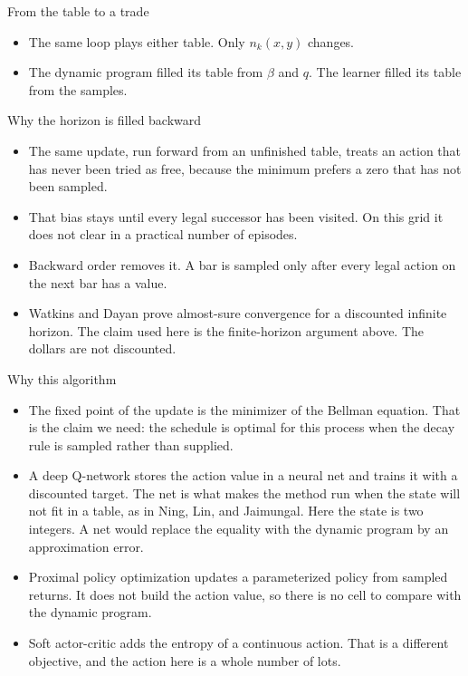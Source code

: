 \documentclass[aspectratio=169,10pt]{beamer}
\newcommand{\currentsource}{}
\newcommand{\framesource}[1]{\gdef\currentsource{#1}}
\newcommand{\aiassisted}{AI assisted, via Grok 4.7}
\begin{document}
\begin{frame}{From the table to a trade}
\framesource{\aiassisted}
\usebox{\tradealg}

\vspace{0.7em}
\begin{itemize}
\item The same loop plays either table. Only \(n_k(x,y)\) changes.
\item The dynamic program filled its table from \(\beta\) and \(q\). The learner filled its table from the samples.
\end{itemize}
\end{frame}

\begin{frame}{Why the horizon is filled backward}
\framesource{Watkins and Dayan, 1992. Finite-horizon argument: \aiassisted.}
\begin{itemize}
\item The same update, run forward from an unfinished table, treats an action that has never been tried as free, because the minimum prefers a zero that has not been sampled.
\item That bias stays until every legal successor has been visited. On this grid it does not clear in a practical number of episodes.
\item Backward order removes it. A bar is sampled only after every legal action on the next bar has a value.
\item Watkins and Dayan prove almost-sure convergence for a discounted infinite horizon. The claim used here is the finite-horizon argument above. The dollars are not discounted.
\end{itemize}
\end{frame}

\begin{frame}{Why this algorithm}
\framesource{Mnih et al., 2015; Schulman et al., 2017; Haarnoja et al., 2018}
\begin{itemize}
\item The fixed point of the update is the minimizer of the Bellman equation. That is the claim we need: the schedule is optimal for this process when the decay rule is sampled rather than supplied.
\item A deep Q-network stores the action value in a neural net and trains it with a discounted target. The net is what makes the method run when the state will not fit in a table, as in Ning, Lin, and Jaimungal. Here the state is two integers. A net would replace the equality with the dynamic program by an approximation error.
\item Proximal policy optimization updates a parameterized policy from sampled returns. It does not build the action value, so there is no cell to compare with the dynamic program.
\item Soft actor-critic adds the entropy of a continuous action. That is a different objective, and the action here is a whole number of lots.
\end{itemize}
\end{frame}
\end{document}
